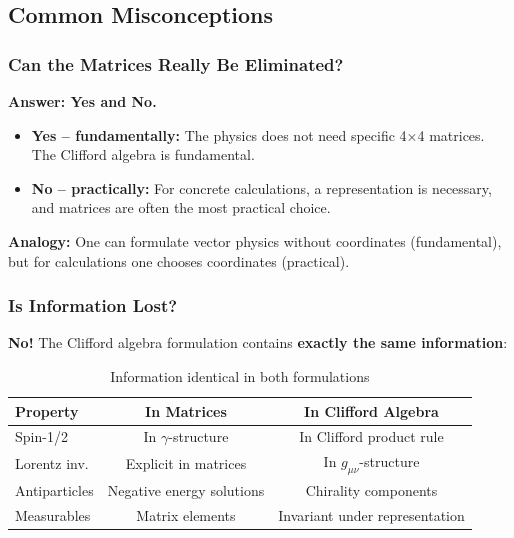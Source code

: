 \subsection{Common Misconceptions}
\label{subsec:common_misconceptions}

\subsubsection{Can the Matrices Really Be Eliminated?}

\textbf{Answer: Yes and No.}

\begin{itemize}
	\item \textbf{Yes – fundamentally:} The physics does not need specific 4×4 matrices. The Clifford algebra is fundamental.
	
	\item \textbf{No – practically:} For concrete calculations, a representation is necessary, and matrices are often the most practical choice.
\end{itemize}

\textbf{Analogy:} One can formulate vector physics without coordinates (fundamental), but for calculations one chooses coordinates (practical).

\subsubsection{Is Information Lost?}

\textbf{No!} The Clifford algebra formulation contains \textbf{exactly the same information}:

\begin{table}[h]
	\centering
	\begin{tabular}{lcc}
		\toprule
		\textbf{Property} & \textbf{In Matrices} & \textbf{In Clifford Algebra} \\
		\midrule
		Spin-1/2 & In $\gamma$-structure & In Clifford product rule \\
		Lorentz inv. & Explicit in matrices & In $g_{\mu\nu}$-structure \\
		Antiparticles & Negative energy solutions & Chirality components \\
		Measurables & Matrix elements & Invariant under representation \\
		\bottomrule
	\end{tabular}
	\caption{Information identical in both formulations}
\end{table}

